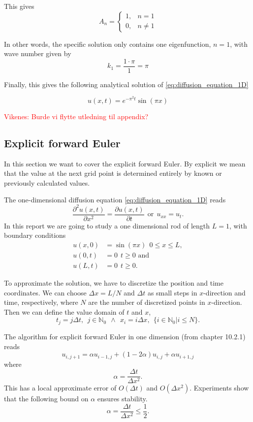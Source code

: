 \documentclass[12pt]{extarticle}
\begin{document}
This gives
\[ A_n = \begin{cases}
	1, & n=1 \\
	0, & n\ne 1
\end{cases} \]

In other words, the specific solution only contains one eigenfunction, $n=1$, with wave number given by
\[ k_1 = \frac{1\cdot \pi}{1} = \pi \]

Finally, this gives the following analytical solution of \eqref{eq:diffusion_equation_1D}

\[ u(x,t) = e^{-\pi^2 t} \sin(\pi x) \]


\textcolor{red}{Vikenes: Burde vi flytte utledning til appendix?}


\subsection*{Explicit forward Euler}
In this section we want to cover the explicit forward Euler. By explicit we mean that the value at the next grid point is determined entirely by known or previously calculated values.

The one-dimensional diffusion equation \eqref{eq:diffusion_equation_1D} reads 
\begin{equation}
\frac{\partial^2u(x, t)}{\partial x^2} = \frac{\partial u(x,t)}{\partial t} \ \ \text{or} \ \ u_{xx} = u_t.
\end{equation}
In this report we are going to study a one dimensional rod of length $L=1$, with boundary conditions
\begin{align}
	u(x,0) &= \sin(\pi x) \ \ 0\leq x\leq L,\\
	u(0,t) &= 0 \ \ t\geq 0 \text{ and} \\
	u(L,t) &= 0 \ \ t\geq 0.
\end{align}

To approximate the solution, we have to discretize the position and time coordinates. We can choose  $\Delta x = L/N$ and $\Delta t$ as small steps in $x$-direction and time, respectively, where $N$ are the number of discretized points in $x$-direction. Then we can define the value domain of $t$ and $x$,
\begin{equation*}
t_j = j\Delta t, \ \ j\in \mathbb{N}_0 \ \ \wedge \ \ x_i = i\Delta x, \ \ \{i \in \mathbb{N}_0 | i \leq N\}.
\end{equation*}

The algorithm for explicit forward Euler in one dimension (from \cite{lectures2015} chapter 10.2.1) reads
\begin{equation}
\label{eq:forward_euler}
u_{i, j+1} = \alpha u_{i-1, j} + (1 - 2\alpha) u_{i,j} + \alpha u_{i+1, j}
\end{equation}
where
\begin{equation*}
\alpha = \frac{\Delta t}{\Delta x^2}.
\end{equation*}
This has a local approximate error of $O(\Delta t)$ and $O(\Delta x ^2)$. Experiments show that the following bound on $\alpha$ ensures stability.
\begin{equation}
	\label{eq:stability}
	\alpha = \frac{\Delta t}{\Delta x^2} \le \frac{1}{2}.
\end{equation} 
\end{document}
